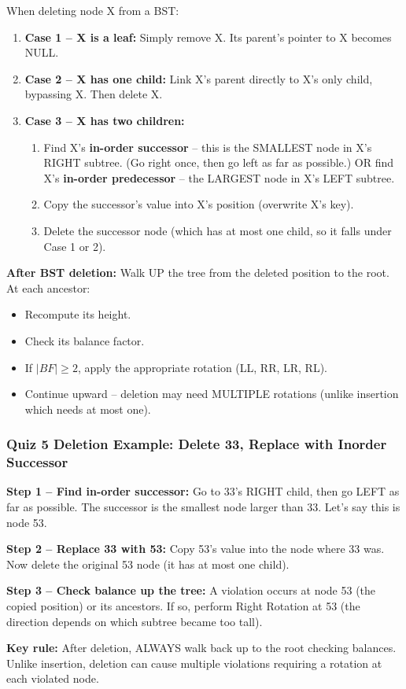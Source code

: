 \documentclass[12pt,portrait]{article}
\begin{document}
\begin{rulebox}
When deleting node X from a BST:
\begin{enumerate}[leftmargin=*]
    \item \textbf{Case 1 -- X is a leaf:} Simply remove X. Its parent's pointer to X becomes NULL.
    \item \textbf{Case 2 -- X has one child:} Link X's parent directly to X's only child, bypassing X. Then delete X.
    \item \textbf{Case 3 -- X has two children:} 
    \begin{enumerate}
        \item Find X's \textbf{in-order successor} -- this is the SMALLEST node in X's RIGHT subtree. (Go right once, then go left as far as possible.) OR find X's \textbf{in-order predecessor} -- the LARGEST node in X's LEFT subtree.
        \item Copy the successor's value into X's position (overwrite X's key).
        \item Delete the successor node (which has at most one child, so it falls under Case 1 or 2).
    \end{enumerate}
\end{enumerate}

\textbf{After BST deletion:} Walk UP the tree from the deleted position to the root. At each ancestor:
\begin{itemize}[leftmargin=*]
    \item Recompute its height.
    \item Check its balance factor.
    \item If $|BF| \geq 2$, apply the appropriate rotation (LL, RR, LR, RL).
    \item Continue upward -- deletion may need MULTIPLE rotations (unlike insertion which needs at most one).
\end{itemize}
\end{rulebox}

\subsubsection{Quiz 5 Deletion Example: Delete 33, Replace with Inorder Successor}

\begin{rulebox}
\textbf{Step 1 -- Find in-order successor:} Go to 33's RIGHT child, then go LEFT as far as possible. The successor is the smallest node larger than 33. Let's say this is node 53.

\textbf{Step 2 -- Replace 33 with 53:} Copy 53's value into the node where 33 was. Now delete the original 53 node (it has at most one child).

\textbf{Step 3 -- Check balance up the tree:} A violation occurs at node 53 (the copied position) or its ancestors. If so, perform Right Rotation at 53 (the direction depends on which subtree became too tall).

\textbf{Key rule:} After deletion, ALWAYS walk back up to the root checking balances. Unlike insertion, deletion can cause multiple violations requiring a rotation at each violated node.
\end{rulebox}
\end{document}
